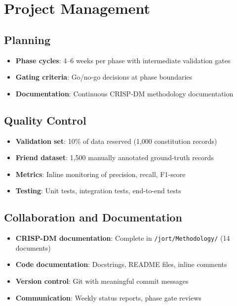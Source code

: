 \documentclass[12pt,a4paper]{report}
\begin{document}
\section{Project Management}

\subsection{Planning}

\begin{itemize}
    \item \textbf{Phase cycles}: 4--6 weeks per phase with intermediate validation gates
    \item \textbf{Gating criteria}: Go/no-go decisions at phase boundaries
    \item \textbf{Documentation}: Continuous CRISP-DM methodology documentation
\end{itemize}

\subsection{Quality Control}

\begin{itemize}
    \item \textbf{Validation set}: 10\% of data reserved (1,000 constitution records)
    \item \textbf{Friend dataset}: 1,500 manually annotated ground-truth records
    \item \textbf{Metrics}: Inline monitoring of precision, recall, F1-score
    \item \textbf{Testing}: Unit tests, integration tests, end-to-end tests
\end{itemize}

\subsection{Collaboration and Documentation}

\begin{itemize}
    \item \textbf{CRISP-DM documentation}: Complete in \texttt{/jort/Methodology/} (14 documents)
    \item \textbf{Code documentation}: Docstrings, README files, inline comments
    \item \textbf{Version control}: Git with meaningful commit messages
    \item \textbf{Communication}: Weekly status reports, phase gate reviews
\end{itemize}
\end{document}
